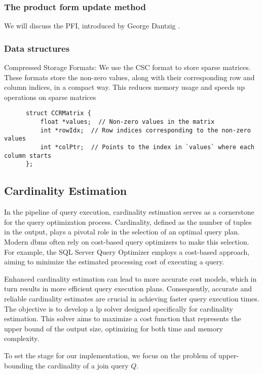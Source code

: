 \subsubsection*{The product form update method}
We will discuss the PFI, introduced by George Dantzig \parencite{dantzig1954product}.
\subsubsection*{Data structures}
Compressed Storage Formats:
We use the CSC format to store sparse matrices. These formats store the non-zero values, along with their corresponding row and column indices,
in a compact way. This reduces memory usage and speeds up operations on sparse matrices

\begin{verbatim}
      struct CCRMatrix {
          float *values;  // Non-zero values in the matrix
          int *rowIdx;  // Row indices corresponding to the non-zero values
          int *colPtr;  // Points to the index in `values` where each column starts
      };
  \end{verbatim}
\subsection{Cardinality Estimation}\label{subsection:cardinality-estimate}
In the pipeline of query execution, cardinality estimation serves
as a cornerstone for the query optimization process.
Cardinality, defined as the number of tuples in the output,
plays a pivotal role in the selection of an optimal query plan.
Modern \gls{dbms} often rely on
cost-based query optimizers to make this selection.
For example, the SQL Server Query Optimizer
\parencite{microsoft2023cardinality} employs a
cost-based approach, aiming to minimize the estimated
processing cost of executing a query.

Enhanced cardinality estimation
can lead to more accurate cost models, which in turn results
in more efficient query execution plans.
Consequently, accurate and reliable cardinality estimates are
crucial in achieving faster query execution times.
The objective is to develop a \gls{lp}
solver designed specifically for cardinality estimation.
This solver aims to maximize a cost function that represents
the upper bound of the output size, optimizing for both
time and memory complexity.

To set the stage for our implementation,
we focus on the problem of upper-bounding the
cardinality of a join query $Q$.

